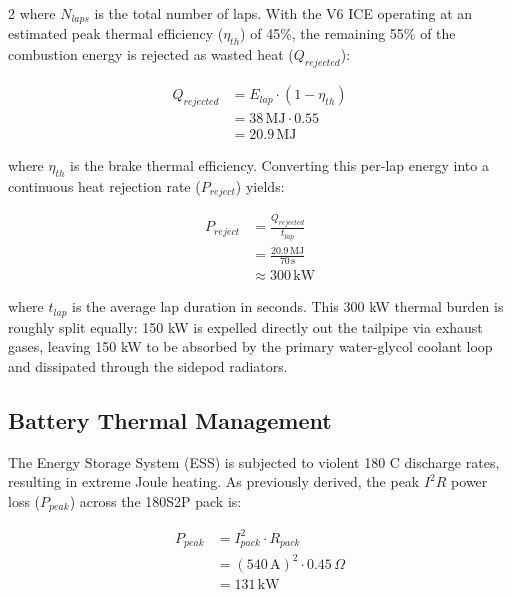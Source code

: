 \begin{multicols}{2}
where $N_{laps}$ is the total number of laps. With the V6 ICE operating at an estimated peak thermal efficiency ($\eta_{th}$) of 45\%, the remaining 55\% of the combustion energy is rejected as wasted heat ($Q_{rejected}$):

\begin{equation} \label{eq:heat_rejected}
\begin{split}
Q_{rejected} &= E_{lap} \cdot (1 - \eta_{th}) \\
&= 38\,\mathrm{MJ} \cdot 0.55 \\
&= 20.9\,\mathrm{MJ}
\end{split}
\end{equation}

where $\eta_{th}$ is the brake thermal efficiency. Converting this per-lap energy into a continuous heat rejection rate ($P_{reject}$) yields:

\begin{equation} \label{eq:continuous_rejection}
\begin{split}
P_{reject} &= \frac{Q_{rejected}}{t_{lap}} \\
&= \frac{20.9\,\mathrm{MJ}}{70\,\mathrm{s}} \\
&\approx 300\,\mathrm{kW}
\end{split}
\end{equation}

where $t_{lap}$ is the average lap duration in seconds. This 300 kW thermal burden is roughly split equally: 150 kW is expelled directly out the tailpipe via exhaust gases, leaving 150 kW to be absorbed by the primary water-glycol coolant loop and dissipated through the sidepod radiators.

\subsection{Battery Thermal Management}

The Energy Storage System (ESS) is subjected to violent 180 C discharge rates, resulting in extreme Joule heating. As previously derived, the peak $I^2R$ power loss ($P_{peak}$) across the 180S2P pack is:

\begin{equation} \label{eq:ess_peak_loss}
\begin{split}
P_{peak} &= I^2_{pack} \cdot R_{pack} \\
&= (540\,\mathrm{A})^2 \cdot 0.45\,\Omega \\
&= 131\,\mathrm{kW}
\end{split}
\end{equation}


\end{multicols}
